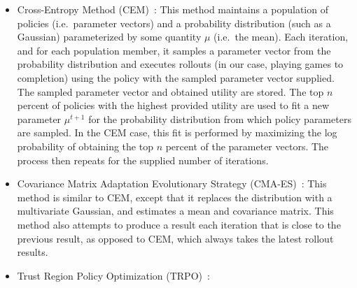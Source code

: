 \begin{itemize}
    \item Cross-Entropy Method (CEM)~\cite{rubinstein2013cross, policyoptimizationNIPS2016}: This method
        maintains a population of policies (i.e.\ parameter vectors) and
        a probability distribution (such as a Gaussian) parameterized by some
        quantity $\mu$ (i.e.\ the mean). Each iteration, and
        for each population member, it samples a parameter vector from the
        probability distribution and executes rollouts (in our case, playing
        games to completion) using the policy with the sampled parameter vector
        supplied. The sampled parameter vector and obtained utility are stored.
        The top $n$ percent of policies with the highest provided utility are
        used to fit a new parameter $\mu^{t+1}$ for the probability
        distribution from which policy parameters are sampled. In the CEM case,
        this fit is performed by maximizing the log probability of obtaining
        the top $n$ percent of the parameter vectors. The process then repeats
        for the supplied number of iterations.

    \item Covariance Matrix Adaptation Evolutionary Strategy (CMA-ES)~\cite{cmaes, policyoptimizationNIPS2016}: This method is similar to CEM, except that it replaces the distribution with a multivariate Gaussian, and estimates a mean and covariance matrix. This method also attempts to produce a result each iteration that is close to the previous result, as opposed to CEM, which always takes the latest rollout results.

    \item Trust Region Policy Optimization (TRPO)~\cite{TRPO, policyoptimizationNIPS2016}: 
\end{itemize}
